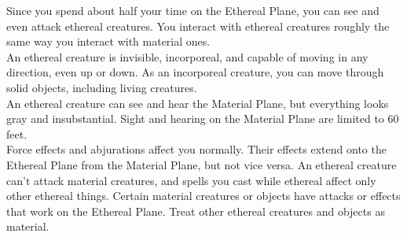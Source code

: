 Since you spend about half your time on the Ethereal Plane, you can see and even attack ethereal creatures. You interact with ethereal creatures roughly the same way you interact with material ones.\\
An ethereal creature is invisible, incorporeal, and capable of moving in any direction, even up or down. As an incorporeal creature, you can move through solid objects, including living creatures.\\
An ethereal creature can see and hear the Material Plane, but everything looks gray and insubstantial. Sight and hearing on the Material Plane are limited to 60 feet.\\
Force effects and abjurations affect you normally. Their effects extend onto the Ethereal Plane from the Material Plane, but not vice versa. An ethereal creature can't attack material creatures, and spells you cast while ethereal affect only other ethereal things. Certain material creatures or objects have attacks or effects that work on the Ethereal Plane. Treat other ethereal creatures and objects as material.\\
